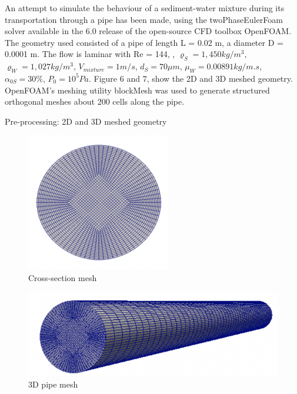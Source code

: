 \documentclass[11pt]{report}
\begin{document}
An attempt to simulate the behaviour of a sediment-water mixture during its transportation through a pipe has been made, using the twoPhaseEulerFoam solver available in the 6.0 release of the open-source CFD toolbox OpenFOAM. 
%
The geometry used consisted of a pipe of length L = 0.02 m, a diameter D = 0.0001 m. 
%
The flow is laminar with Re = 144,  , $\varrho_S= 1,450  kg/m^3$, $\varrho_W= 1,027  kg/m^3$, $V_{mixture} = 1 m/s$, $d_S= 70 \mu m$, $\mu_W = 0.00891  kg/m.s$, $\alpha_{0S} = 30 \%$, $P_0=10^5  Pa$. 
%
Figure 6 and 7, show the 2D and 3D meshed geometry. OpenFOAM's meshing utility blockMesh was used to generate structured orthogonal meshes about 200 cells along the pipe.
%
\begin{itemize}
 \bf{\item Pre-processing: 2D and 3D meshed geometry}
  \end{itemize}
 \vspace{0.5cm}
\vspace{-0.6cm}
\begin{figure}[ht!]
 \begin{center}
 
 \includegraphics[trim=0cm 0cm 0cm 0cm,clip,scale=0.6]{figs/1.png}
 \caption{ Cross-section mesh}
 \label{fig:gauss}
 \end{center}
 \end{figure} 
%
 \begin{figure}[ht!]
 \begin{center}
 
 \includegraphics[trim=0cm 0cm 0cm 0cm,clip,scale=0.6]{figs/2.png}
 \caption{ 3D pipe mesh}
 \label{fig:gauss}
 \end{center}
 \end{figure} 
\end{document}
